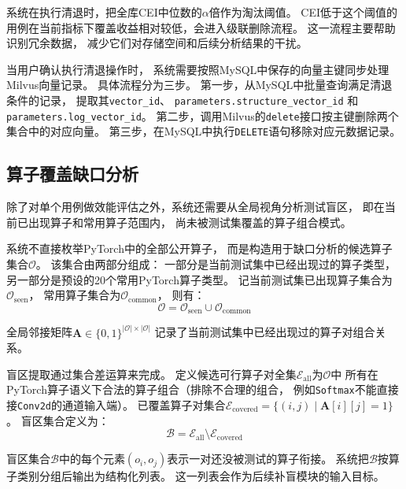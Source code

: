 系统在执行清退时，把全库CEI中位数的$\alpha$倍作为淘汰阈值。
CEI低于这个阈值的用例在当前指标下覆盖收益相对较低，会进入级联删除流程。
这一流程主要帮助识别冗余数据，
减少它们对存储空间和后续分析结果的干扰。

当用户确认执行清退操作时，
系统需要按照MySQL中保存的向量主键同步处理Milvus向量记录。
具体流程分为三步。
第一步，从MySQL中批量查询满足清退条件的记录，
提取其\texttt{vector\_id}、
\texttt{parameters.structure\_}\allowbreak\texttt{vector\_id}
和\texttt{parameters.log\_vector\_id}。
第二步，调用Milvus的\texttt{delete}接口按主键删除两个集合中的对应向量。
第三步，在MySQL中执行\texttt{DELETE}语句移除对应元数据记录。

\subsection{算子覆盖缺口分析}

除了对单个用例做效能评估之外，系统还需要从全局视角分析测试盲区，
即在当前已出现算子和常用算子范围内，
尚未被测试集覆盖的算子组合模式。

系统不直接枚举PyTorch中的全部公开算子，
而是构造用于缺口分析的候选算子集合$\mathcal{O}$。
该集合由两部分组成：
一部分是当前测试集中已经出现过的算子类型，
另一部分是预设的20个常用PyTorch算子类型。
记当前测试集已出现算子集合为$\mathcal{O}_{\text{seen}}$，
常用算子集合为$\mathcal{O}_{\text{common}}$，
则有：
\begin{equation}
\label{eq:operator_pool}
\mathcal{O} = \mathcal{O}_{\text{seen}} \cup \mathcal{O}_{\text{common}}
\end{equation}

全局邻接矩阵$\mathbf{A} \in \{0,1\}^{|\mathcal{O}| \times |\mathcal{O}|}$
记录了当前测试集中已经出现过的算子对组合关系。

盲区提取通过集合差运算来完成。
定义候选可行算子对全集$\mathcal{E}_{\text{all}}$为$\mathcal{O}$中
所有在PyTorch算子语义下合法的算子组合（排除不合理的组合，
例如\texttt{Softmax}不能直接接\texttt{Conv2d}的通道输入端）。
已覆盖算子对集合$\mathcal{E}_{\text{covered}} = \{(i,j) \mid \mathbf{A}[i][j] = 1\}$。
盲区集合定义为：
\begin{equation}
\label{eq:blind_spots}
\mathcal{B} = \mathcal{E}_{\text{all}} \setminus \mathcal{E}_{\text{covered}}
\end{equation}

盲区集合$\mathcal{B}$中的每个元素$(o_i, o_j)$表示一对还没被测试的算子衔接。
系统把$\mathcal{B}$按算子类别分组后输出为结构化列表。
这一列表会作为后续补盲模块的输入目标。

